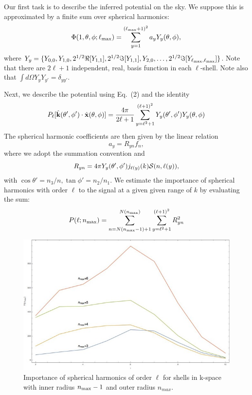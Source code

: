 \documentclass[12pt]{article}
\begin{document}
Our first task is to describe the inferred potential on the sky. We suppose this is approximated by a finite sum over spherical harmonics:
\begin{equation}
\Phi(1,\theta,\phi;\ell_{\rm max})=\sum_{y=1}^{(\ell_{\rm max}+1)^2}a_yY_y(\theta,\phi),
\end{equation}
where $Y_y=\{Y_{0,0},Y_{1,0},2^{1/2}\Re[Y_{1,1}],2^{1/2}\Im[Y_{1,1}],Y_{2,0},\dots,2^{1/2}\Im[Y_{\ell_{\rm max},\ell_{\rm max}}]\}$. Note that there are $2\ell+1$ independent, real, basis function in each $\ell$-shell. Note also that $\int d\Omega Y_yY_{y'}=\delta_{yy'}$.

Next, we describe the potential using Eq.~(2) and the identity
\begin{equation}
P_{\ell}[\hat{\bf k}(\theta',\phi')\cdot\hat{\bf x}(\theta,\phi)]=\frac{4\pi}{2\ell+1}\sum_{y=\ell^2+1}^{(\ell+1)^2}Y_y(\theta',\phi')Y_y(\theta,\phi)
\end{equation}
The spherical harmonic coefficients are then given by the linear relation
\begin{equation}
a_y=R_{yn}f_n,
\end{equation}
where we adopt the summation convention and 
\begin{equation}
R_{yn}=4\pi Y_y(\theta',\phi')j_{\ell(y)}(k){\cal S}(n,\ell(y)),
\end{equation}
with $\cos\theta'=n_3/n,\tan\phi'=n_2/n_1$. We estimate the importance of spherical harmonics with order $\ell$ to the signal at a given given range of $k$ by evaluating the sum:
\begin{equation}
P(\ell;n_{\rm max})=\sum_{n=N(n_{\rm max}-1)+1}^{N(n_{\rm max})}\sum_{y=\ell^2+1}^{(\ell+1)^2}R_{yn}^2
\end{equation} 
\begin{figure}[h!]
\centering
\includegraphics[width=6in]{fig6.jpg} 
\caption{Importance of spherical harmonics of order $\ell$ for shells in k-space with inner radius $n_{\rm max}-1$ and outer radius $n_{max}$.}
\end{figure}
   
\end{document}
